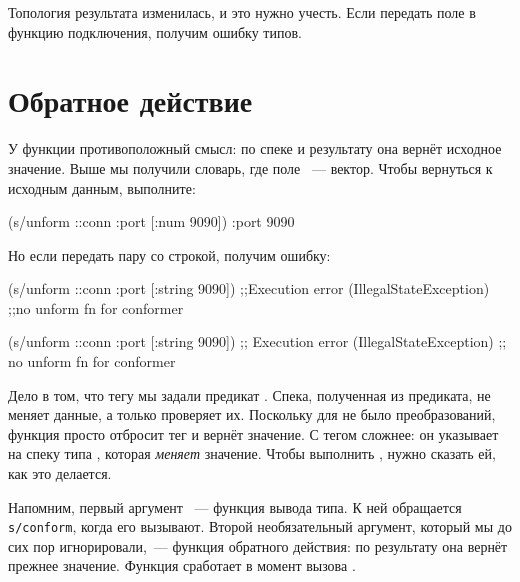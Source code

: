 \fi

Топология результата изменилась, и это нужно учесть. Если передать поле
 в функцию подключения, получим ошибку типов.

\section{Обратное действие}


У функции  противоположный смысл: по спеке и результату она
вернёт исходное значение. Выше мы получили словарь, где поле ~---
вектор. Чтобы вернуться к исходным данным, выполните:

\begin{clojure}
(s/unform ::conn {:port [:num 9090]})
{:port 9090}
\end{clojure}

\noindent
Но если передать пару со строкой, получим ошибку:

\ifnarrow

\begin{clojure}
(s/unform ::conn {:port [:string 9090]})
;;Execution error (IllegalStateException)
;;no unform fn for conformer
\end{clojure}

\else

\begin{clojure}
(s/unform ::conn {:port [:string 9090]})
;; Execution error (IllegalStateException)
;; no unform fn for conformer
\end{clojure}

\fi

Дело в том, что тегу  мы задали предикат . Спека,
полученная из предиката, не меняет данные, а только проверяет их. Поскольку для
 не было преобразований, функция  просто отбросит тег
и вернёт значение. С тегом  сложнее: он указывает на спеку типа
, которая \emph{меняет} значение. Чтобы выполнить ,
нужно сказать ей, как это делается.


Напомним, первый аргумент ~--- функция вывода типа. К ней
обращается \texttt{s/con\-form}, когда его вызывают. Второй необязательный
аргумент, который мы до сих пор игнорировали,~--- функция обратного действия: по
результату  она вернёт прежнее значение. Функция сработает в
момент вызова .

